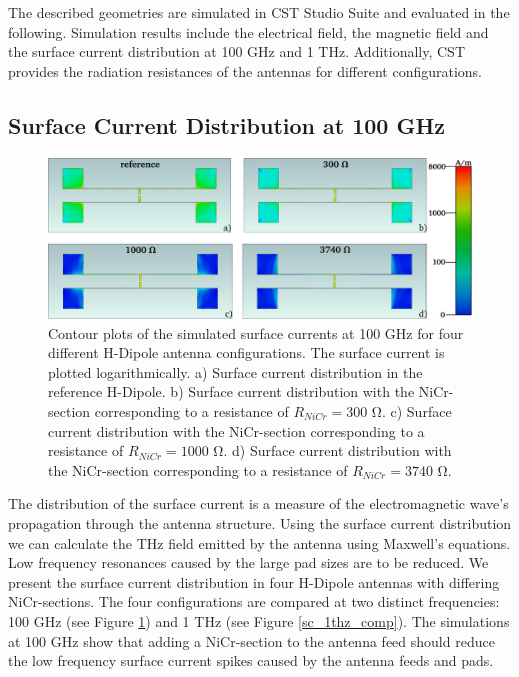 The described geometries are simulated in CST Studio Suite and evaluated in the following. Simulation results include the electrical field, the magnetic field and the surface current distribution at \num{100} \si{\giga \hertz} and \num{1} \si{\tera \hertz}. Additionally, CST provides the radiation resistances of the antennas for different configurations. 

\subsection{Surface Current Distribution at 100 GHz}

\begin{figure}[ht]
    \centering
    \includegraphics[width=\linewidth]{figures/Contour_Plots_v2/100Ghz_SC_sim_plots.pdf}
    \caption{Contour plots of the simulated surface currents at \num{100} \si{\giga \hertz} for four different H-Dipole antenna configurations. The surface current is plotted logarithmically. a) Surface current distribution in the reference H-Dipole. b) Surface current distribution with the NiCr-section corresponding to a resistance of $R_{NiCr} = 300$ \si{\ohm}. c) Surface current distribution with the NiCr-section corresponding to a resistance of $R_{NiCr} = 1000$ \si{\ohm}. d) Surface current distribution with the NiCr-section corresponding to a resistance of $R_{NiCr} = 3740$ \si{\ohm}.}
    \label{sc_100ghz_comp}
\end{figure}

The distribution of the surface current is a measure of the electromagnetic wave's propagation through the antenna structure. Using the surface current distribution we can calculate the THz field emitted by the antenna using Maxwell's equations. Low frequency resonances caused by the large pad sizes are to be reduced. We present the surface current distribution in four H-Dipole antennas with differing NiCr-sections. The four configurations are compared at two distinct frequencies: \num{100} \si{\giga \hertz} (see Figure \ref{sc_100ghz_comp}) and \num{1} \si{\tera \hertz} (see Figure \ref{sc_1thz_comp}). The simulations at \num{100} \si{\giga \hertz} show that adding a NiCr-section to the antenna feed should reduce the low frequency surface current spikes caused by the antenna feeds and pads.

